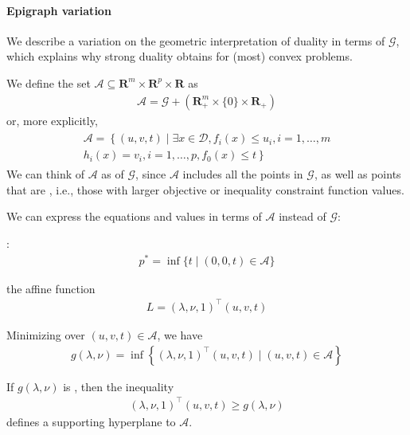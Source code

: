 \documentclass{article}
\begin{document}
\paragraph{Epigraph variation}\label{sec:ghgp}
 We describe a variation on the geometric interpretation of duality in terms of $\mathcal{G}$, which explains why strong duality obtains for (most) convex problems. 
 
 We define the set $\mathcal{A} \subseteq \mathbf{R}^{m} \times \mathbf{R}^{p} \times \mathbf{R}$ as
\begin{align*}
\mathcal{A}=\mathcal{G}+\left(\mathbf{R}_{+}^{m} \times\{0\} \times \mathbf{R}_{+}\right)
\end{align*}
or, more explicitly,
\begin{align*}
\begin{gathered}
\mathcal{A}=\left\{(u, v, t) \mid \exists x \in \mathcal{D}, f_{i}(x) \leq u_{i}, i=1, \ldots, m\right. \\
\left.h_{i}(x)=v_{i}, i=1, \ldots, p, f_{0}(x) \leq t\right\}
\end{gathered}
\end{align*}
We can think of $\mathcal{A}$ as  of $\mathcal{G}$, since $\mathcal{A}$ includes all the points in $\mathcal{G}$, as well as points that are , i.e., those with larger objective or inequality constraint function values.

We can express the equations and values in terms of $\mathcal{A}$ instead of $\mathcal{G}$:

:
\begin{align*}
p^* =\inf \{t \mid(0,0, t) \in \mathcal{A}\}
\end{align*}

  the affine function
\begin{align*}
    L=(\lambda, \nu, 1)^{\top}(u, v, t)
\end{align*}

Minimizing over $(u, v, t) \in\mathcal{A}$, we have  
\begin{align*}
g(\lambda, \nu)=\inf \left\{(\lambda, \nu, 1)^{\top}(u, v, t) \mid(u, v, t) \in \mathcal{A}\right\}
\end{align*}

If $g(\lambda, \nu)$ is , then the inequality
\begin{align*}
(\lambda, \nu, 1)^{\top}(u, v, t) \geq g(\lambda, \nu)
\end{align*}
defines a  supporting hyperplane to $\mathcal{A}$.
\end{document}
